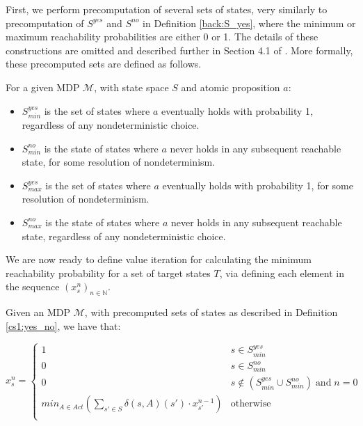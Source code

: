 First, we perform precomputation of several sets of states, very similarly to precomputation of $S^{yes}$ and $S^{no}$ in Definition \ref{back:S_yes}, where the minimum or maximum reachability probabilities are either 0 or 1. The details of these constructions are omitted and described further in Section 4.1 of \cite{forejt_automated_2011}. More formally, these precomputed sets are defined as follows.

\begin{definition}
\label{cs1:yes_no}

For a given MDP $\mathcal{M}$, with state space $S$ and atomic proposition $a$:

\begin{itemize}
    \item $S^{yes}_{min}$ is the set of states where $a$ eventually holds with probability 1, regardless of any nondeterministic choice.
    \item $S^{no}_{min}$ is the state of states where $a$ never holds in any subsequent reachable state, for some resolution of nondeterminism.
    \item $S^{yes}_{max}$ is the set of states where $a$ eventually holds with probability 1, for some resolution of nondeterminism.
    \item $S^{no}_{max}$ is the state of states where $a$ never holds in any subsequent reachable state, regardless of any nondeterministic choice.  
\end{itemize}
\end{definition}

We are now ready to define value iteration for calculating the minimum reachability probability for a set of target states $T$, via defining each element in the sequence $(x^n_s)_{n \in \mathbb{N}}$.

\begin{definition}
\label{cs1:value_iteration}

Given an MDP $\mathcal{M}$, with precomputed sets of states as described in Definition \ref{cs1:yes_no}, we have that:

\begin{equation*}
x^n_s = \begin{cases}
        1 & s \in S^{yes}_{min} \\
        0 & s \in S^{no}_{min} \\
        0 & s \notin (S^{yes}_{min} \cup S^{no}_{min}) \; \text{and} \; n=0 \\
        min_{A \in Act} \left( \sum_{s' \in S}\delta(s,A)(s') \cdot x^{n-1}_{s'} \right) & \text{otherwise} \\
    \end{cases}
\end{equation*}

\end{definition}


